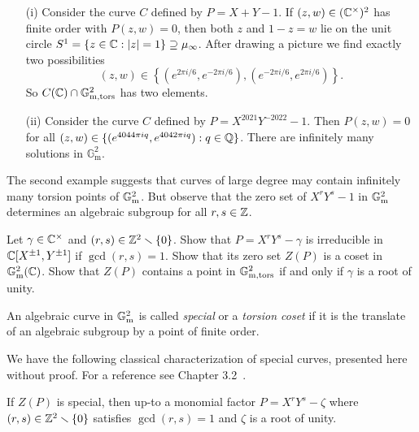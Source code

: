 \begin{example}
  \begin{itemize}
  \item [(i)] Consider the curve $C$ defined by $P = X+Y-1$. If
    $(z,w)\in({\mathbb{C}}^\times)^2$ has finite order with $P(z,w)=0$, then
    both $z$ and $1-z=w$ lie on the unit circle $S^1= \{z\in{\mathbb{C}} :
    |z|=1\}\supseteq\mu_\infty$. 
    After drawing a picture we find exactly two possibilities    
    $$
    (z,w) \in \left\{ (e^{2\pi i/6},e^{-2\pi i/6}),(e^{-2\pi
        i/6},e^{2\pi i/6})\right\}.
    $$
    So $C({\mathbb{C}})\cap {\mathbb{G}}^2_{{\mathrm{m}},\mathrm{tors}}$ has two elements.

  \item[(ii)] Consider the curve $C$ defined by
    $P=X^{2021}Y^{-2022}-1$. Then
    $P(z,w)=0$ for all $(z,w)\in \{(e^{4044\pi iq},e^{4042\pi i
      q}) : q\in{\mathbb{Q}}\}$.
    There are infinitely many solutions in $\mathbb{G}_{\mathrm{m}}^2$.
  \end{itemize}
\end{example}

The second example suggests that curves of large degree may contain
infinitely many torsion points of ${\mathbb{G}}_{\mathrm{m}}^2$. But observe that the zero
set of $X^{r}Y^{s}-1$ in ${\mathbb{G}}_{\mathrm{m}}^2$ determines an algebraic subgroup for all
$r,s\in{\mathbb{Z}}$. 

\begin{exercise}
  \label{exer:infinitemany}
  Let $\gamma\in {\mathbb{C}}^\times$ and $(r,s)\in{\mathbb{Z}}^2\smallsetminus
  \{0\}$.  Show that $P=X^rY^s-\gamma$ is irreducible in ${\mathbb{C}}[X^{\pm
    1},Y^{\pm 1}]$ if $\gcd(r,s)=1$. Show that its zero set $Z(P)$ is a coset in
  ${\mathbb{G}}_{\mathrm{m}}^2({\mathbb{C}})$. Show that $Z(P)$ contains a point in
  ${\mathbb{G}}^2_{{\mathrm{m}},\mathrm{tors}}$ if and only if $\gamma$ is a root of unity. 
\end{exercise}

\begin{definition}
  An algebraic curve in ${\mathbb{G}}_{\mathrm{m}}^2$
  is called \emph{special} or a \emph{torsion coset}
  if it is the translate of an algebraic subgroup by
  a point of finite order. 
\end{definition}

We have the following classical characterization of special curves,
presented here without proof. For a reference see Chapter 3.2~\cite{BG}.

\begin{lemma}
  \label{lem:specialGm2}
  If $Z(P)$ is special, then up-to a monomial factor
  $P=X^rY^s-\zeta$ where $(r,s)\in{\mathbb{Z}}^2\smallsetminus\{0\}$
  satisfies $\gcd(r,s)=1$ 
  and $\zeta$ is a root of unity. 
\end{lemma}

